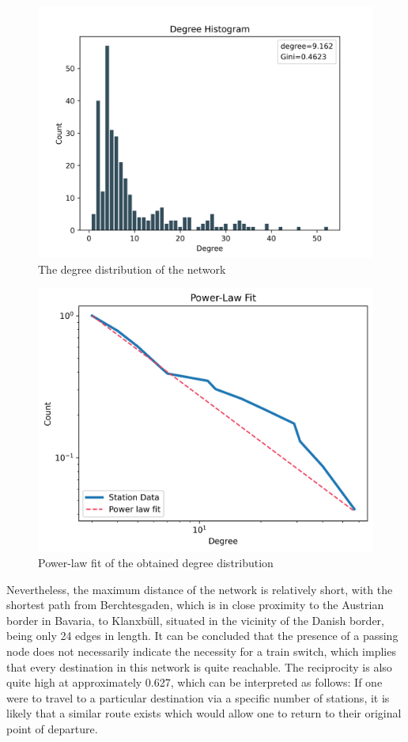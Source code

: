 \documentclass[12pt,a4paper]{article}
\begin{document}
\begin{figure}[h]
  \includegraphics[clip=true,width=\columnwidth]{../data/visualizations/degree_dist.png}
  \caption{The degree distribution of the network}
   \label{fig:network-deg-dist}
\end{figure}

\begin{figure}[h]
  \includegraphics[clip=true,width=\columnwidth]{../data/visualizations/powerlaw_fit.png}
  \caption{Power-law fit of the obtained degree distribution}
   \label{fig:network-powerlaw}
\end{figure}

Nevertheless, the maximum distance of the network is relatively short, with the shortest path from Berchtesgaden, which is in close proximity to the Austrian border in Bavaria, to Klanxbüll, situated in the vicinity of the Danish border, being only 24 edges in length. 
It can be concluded that the presence of a passing node does not necessarily indicate the necessity for a train switch, which implies that every destination in this network is quite reachable. The reciprocity is also quite high at approximately 0.627, which can be interpreted as follows: If one were to travel to a particular destination via a specific number of stations, it is likely that a similar route exists which would allow one to return to their original point of departure. 
\end{document}

